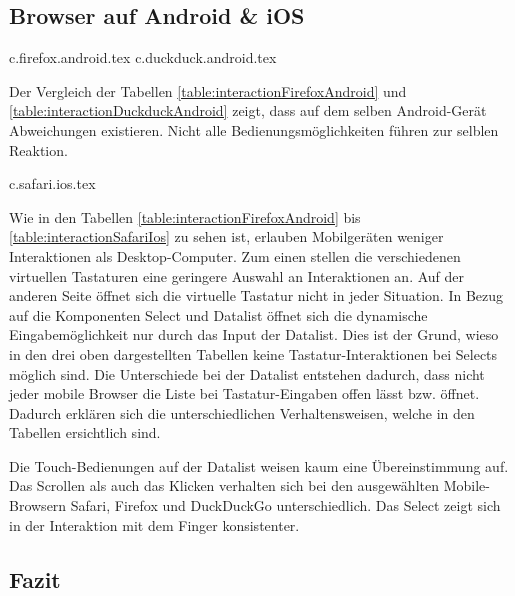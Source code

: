 \clearpage
\subsection{Browser auf Android \& iOS}
\label{sec:mobileBrowser}

{c.firefox.android.tex}
{c.duckduck.android.tex}

Der Vergleich der Tabellen \ref{table:interactionFirefoxAndroid} und \ref{table:interactionDuckduckAndroid} zeigt, dass auf dem selben Android-Gerät Abweichungen existieren.
Nicht alle Bedienungsmöglichkeiten führen zur selblen Reaktion.

\clearpage
{c.safari.ios.tex}

Wie in den Tabellen \ref{table:interactionFirefoxAndroid} bis \ref{table:interactionSafariIos} zu sehen ist, erlauben Mobilgeräten weniger Interaktionen als Desktop-Computer.
Zum einen stellen die verschiedenen virtuellen Tastaturen eine geringere Auswahl an Interaktionen an.
Auf der anderen Seite öffnet sich die virtuelle Tastatur nicht in jeder Situation. 
In Bezug auf die Komponenten Select und Datalist öffnet sich die dynamische Eingabemöglichkeit nur durch das Input der Datalist.
Dies ist der Grund, wieso in den drei oben dargestellten Tabellen keine Tastatur-Interaktionen bei Selects möglich sind. 
Die Unterschiede bei der Datalist entstehen dadurch, dass nicht jeder mobile Browser die Liste bei Tastatur-Eingaben offen lässt bzw. öffnet.
Dadurch erklären sich die unterschiedlichen Verhaltensweisen, welche in den Tabellen ersichtlich sind.

Die Touch-Bedienungen auf der Datalist weisen kaum eine Übereinstimmung auf. 
Das Scrollen als auch das Klicken verhalten sich bei den ausgewählten Mobile-Browsern Safari, Firefox und DuckDuckGo unterschiedlich.
Das Select zeigt sich in der Interaktion mit dem Finger konsistenter. 


\clearpage
\subsection{Fazit}
\label{sec:summeryExisting}


